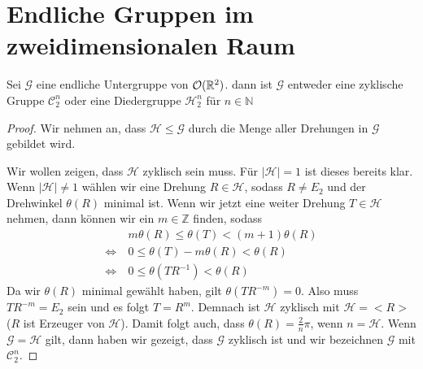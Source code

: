 \section{Endliche Gruppen im zweidimensionalen Raum}
\begin{theorem}
 Sei $\mathcal{G}$ eine endliche Untergruppe von ${\mathcal{O}(\mathbb{R}^2)}$. dann ist $\mathcal{G}$ entweder eine zyklische Gruppe $\mathcal{C}^n_2$ oder eine Diedergruppe $\mathcal{H}^n_2$ für $n \in \mathbb{N}$
\end{theorem}
\begin{proof}
 Wir nehmen an, dass $\mathcal{H} \leq \mathcal{G}$ durch die Menge aller Drehungen in $\mathcal{G}$ gebildet wird.
 
 Wir wollen zeigen, dass $\mathcal{H}$ zyklisch sein muss. Für $|\mathcal{H}|=1$ ist dieses bereits klar. Wenn $|\mathcal{H}| \neq 1$ wählen wir eine Drehung $R \in \mathcal{H}$, sodass $R \neq E_2$ und der Drehwinkel $\theta(R)$ minimal ist. Wenn wir jetzt eine weiter Drehung $T \in \mathcal{H}$ nehmen, dann können wir ein $m \in \mathbb{Z}$ finden, sodass \begin{align*}
        &m \theta(R)\leq\theta(T)<(m+1)\theta(R) \\
        \Leftrightarrow \ &0 \leq \theta(T)-m\theta(R)<\theta(R) \\
        \Leftrightarrow \ &0 \leq \theta(TR^{-1})<\theta(R)                                                                                                                                                                                                                                                                                                                                                           
\end{align*}
Da wir $\theta(R)$ minimal gewählt haben, gilt $\theta(TR^{-m})=0$. Also muss $TR^{-m}=E_2$ sein und es folgt $T=R^{m}$. Demnach ist $\mathcal{H}$ zyklisch mit $\mathcal{H}=<R>$ ($R$ ist Erzeuger von $\mathcal{H}$). Damit folgt auch, dass $\theta(R)=\frac{2}{n}\pi$, wenn $n=\mathcal{H}$. Wenn $\mathcal{G} = \mathcal{H}$ gilt, dann haben wir gezeigt, dass $\mathcal{G}$ zyklisch ist und wir bezeichnen $\mathcal{G}$ mit $\mathcal{C}^n_2$.


\end{proof}
